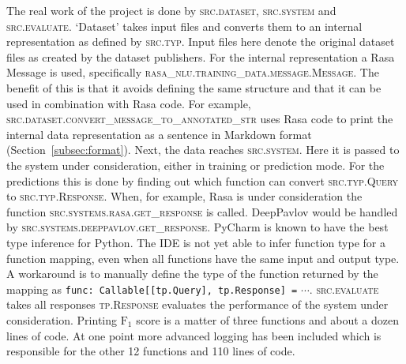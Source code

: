 The real work of the project is done by \textsc{src.dataset}, \textsc{src.system} and \textsc{src.evaluate}.
`Dataset' takes input files and converts them to an internal representation as defined by \textsc{src.typ}.
Input files here denote the original dataset files as created by the dataset publishers.
For the internal representation a Rasa Message is used, specifically \textsc{rasa\_nlu.training\_data.message.Message}.
The benefit of this is that it avoids defining the same structure and that it can be used in combination with Rasa code.
For example, \textsc{src.dataset.convert\_message\_to\_annotated\_str} uses Rasa code to print the internal data representation as a sentence in Markdown format (Section~\ref{subsec:format}).
Next, the data reaches \textsc{src.system}.
Here it is passed to the system under consideration, either in training or prediction mode.
For the predictions this is done by finding out which function can convert \textsc{src.typ.Query} to \textsc{src.typ.Response}.
When, for example, Rasa is under consideration the function \textsc{src.systems.rasa.get\_response} is called.
DeepPavlov would be handled by \textsc{src.systems.deeppavlov.get\_response}.
PyCharm is known to have the best type inference for Python.
The IDE is not yet able to infer function type for a function mapping, even when all functions have the same input and output type.
A workaround is to manually define the type of the function returned by the mapping as \verb|func: Callable[[tp.Query], tp.Response] =| $\cdots$.
\textsc{src.evaluate} takes all responses \textsc{tp.Response} evaluates the performance of the system under consideration.
Printing $\text{F}_1$ score is a matter of three functions and about a dozen lines of code.
At one point more advanced logging has been included which is responsible for the other 12 functions and 110 lines of code.
